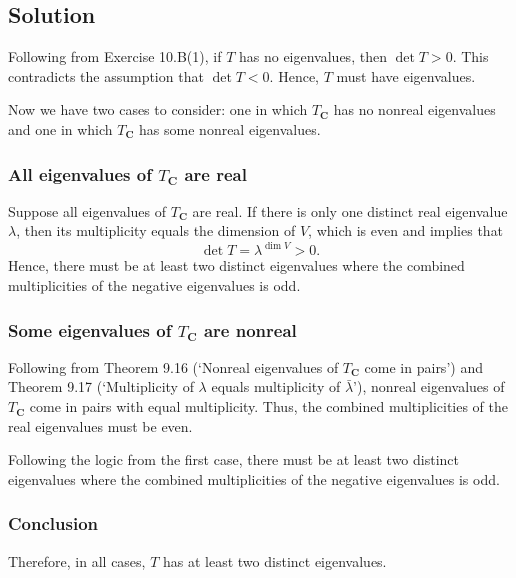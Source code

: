 \documentclass{article}
\begin{document}
\subsection*{Solution}
Following from Exercise 10.B(1), if $T$ has no eigenvalues, then $\det T>0$. 
This contradicts the assumption that $\det T<0$. 
Hence, $T$ must have eigenvalues. 

Now we have two cases to consider: one in which $T_{\mathbf{C}}$ has no nonreal eigenvalues and one in which $T_{\mathbf{C}}$ has some nonreal eigenvalues.

\subsubsection*{All eigenvalues of $T_{\mathbf{C}}$ are real}
Suppose all eigenvalues of $T_{\mathbf{C}}$ are real. 
If there is only one distinct real eigenvalue $\lambda$, then its multiplicity equals the dimension of $V$, which is even and implies that
\[\det T=\lambda^{\dim V}>0.\]
Hence, there must be at least two distinct eigenvalues where the combined multiplicities of the negative eigenvalues is odd.

\subsubsection*{Some eigenvalues of $T_{\mathbf{C}}$ are nonreal}
Following from Theorem 9.16 (`Nonreal eigenvalues of $T_{\mathbf{C}}$ come in pairs') and Theorem 9.17 (`Multiplicity of $\lambda$ equals multiplicity of $\bar{\lambda}$'), nonreal eigenvalues of $T_{\mathbf{C}}$ come in pairs with equal multiplicity. 
Thus, the combined multiplicities of the real eigenvalues must be even. 

Following the logic from the first case, there must be at least two distinct eigenvalues where the combined multiplicities of the negative eigenvalues is odd.

\subsubsection*{Conclusion}
Therefore, in all cases, $T$ has at least two distinct eigenvalues.
\end{document}
